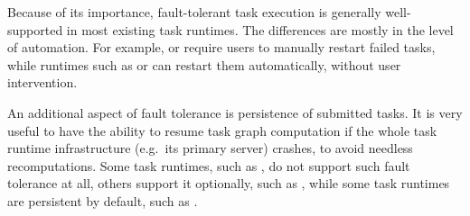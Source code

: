 Because of its importance, fault-tolerant task execution is generally well-supported in most
existing task runtimes. The differences are mostly in the level of automation. For example,
\fireworks{} or \merlin{} require users to manually restart failed tasks,
while runtimes such as \dask{} or \balsam{} can restart them
automatically, without user intervention.

An additional aspect of fault tolerance is persistence of submitted tasks. It is very useful to
have the ability to resume task graph computation if the whole task runtime infrastructure (e.g.\
its primary server) crashes, to avoid needless recomputations. Some task runtimes, such as
\dask{}, do not support such fault tolerance at all, others support it optionally,
such as \ray{}, while some task runtimes are persistent by default, such as
\balsam{}.

